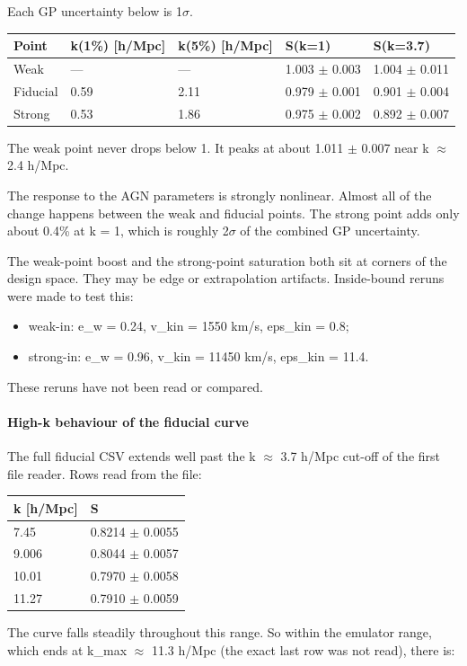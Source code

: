 \documentclass[11pt,a4paper]{article}
\begin{document}
Each GP uncertainty below is 1$\sigma$.

\begin{longtable}{@{}p{}p{}p{}p{}p{}@{}}
\toprule
\textbf{Point} & \textbf{k(1\%) [h/Mpc]} & \textbf{k(5\%) [h/Mpc]} & \textbf{S(k=1)} & \textbf{S(k=3.7)} \\ \midrule \endhead
Weak & --- & --- & 1.003 $\pm$ 0.003 & 1.004 $\pm$ 0.011 \\
Fiducial & 0.59 & 2.11 & 0.979 $\pm$ 0.001 & 0.901 $\pm$ 0.004 \\
Strong & 0.53 & 1.86 & 0.975 $\pm$ 0.002 & 0.892 $\pm$ 0.007 \\
\bottomrule\end{longtable}
The weak point never drops below 1. It peaks at about 1.011 $\pm$ 0.007 near k $\approx$ 2.4 h/Mpc.

The response to the AGN parameters is strongly nonlinear. Almost all of the change happens between the weak and fiducial points. The strong point adds only about 0.4\% at k = 1, which is roughly 2$\sigma$ of the combined GP uncertainty.

The weak-point boost and the strong-point saturation both sit at corners of the design space. They may be edge or extrapolation artifacts. Inside-bound reruns were made to test this:

\begin{itemize}
  \item weak-in: e\_w = 0.24, v\_kin = 1550 km/s, eps\_kin = 0.8;
  \item strong-in: e\_w = 0.96, v\_kin = 11450 km/s, eps\_kin = 11.4.
\end{itemize}
These reruns have not been read or compared.

\paragraph{High-k behaviour of the fiducial curve}
The full fiducial CSV extends well past the k $\approx$ 3.7 h/Mpc cut-off of the first file reader. Rows read from the file:

\begin{longtable}{@{}p{}p{}@{}}
\toprule
\textbf{k [h/Mpc]} & \textbf{S} \\ \midrule \endhead
7.45 & 0.8214 $\pm$ 0.0055 \\
9.006 & 0.8044 $\pm$ 0.0057 \\
10.01 & 0.7970 $\pm$ 0.0058 \\
11.27 & 0.7910 $\pm$ 0.0059 \\
\bottomrule\end{longtable}
The curve falls steadily throughout this range. So within the emulator range, which ends at k\_max $\approx$ 11.3 h/Mpc (the exact last row was not read), there is:
\end{document}
